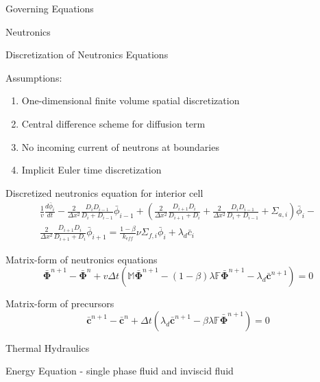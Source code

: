 \documentclass{beamer}
\begin{document}
\begin{section}{Governing Equations}
\begin{frame}{Neutronics}
\begin{customlist}{2ex}{0pt}
\end{customlist}
\end{frame}
\begin{frame}{Discretization of Neutronics Equations}
\begin{block}{Assumptions:}
\begin{enumerate}
  \item One-dimensional finite volume spatial discretization
  \item Central difference scheme for diffusion term
  \item No incoming current of neutrons at boundaries
  \item Implicit Euler time discretization
\end{enumerate}
\end{block}
\begin{customlist}{2ex}{0pt}
  \item Discretized neutronics equation for interior cell
  \begin{multline}
    \nonumber
    \frac{1}{v}\frac{d\bar{\phi}_{i}}{dt}-\frac{2}{\Delta x^{2}}\frac{D_{i}D_{i-1}}{D_{i}+D_{i-1}}\bar{\phi}_{i-1}+\left(\frac{2}{\Delta x^{2}}\frac{D_{i+1}D_{i}}{D_{i+1}+D_{i}}+\frac{2}{\Delta x^{2}}\frac{D_{i}D_{i-1}}{D_{i}+D_{i-1}}+\Sigma_{a,i}\right)\bar{\phi}_{i}-\\
    \frac{2}{\Delta x^{2}}\frac{D_{i+1}D_{i}}{D_{i+1}+D_{i}}\bar{\phi}_{i+1}=\frac{1-\beta}{k_{eff}}\nu\Sigma_{f,i}\bar{\phi}_{i}+\lambda_{d}\bar{c}_{i}
  \end{multline}
  \item Matrix-form of neutronics equations
  \[
    \bar{\mathbf{\Phi}}^{n+1}-\bar{\mathbf{\Phi}}^{n}+v\Delta t\left(\mathbb{M}\bar{\mathbf{\Phi}}^{n+1}-\left(1-\beta\right)\lambda\mathbb{F}\bar{\mathbf{\Phi}}^{n+1}-\lambda_{d}\mathbf{\bar{c}}^{n+1}\right)=0
  \]
  \item Matrix-form of precursors
  \[
    \mathbf{\bar{c}}^{n+1}-\mathbf{\bar{c}}^{n}+\Delta t\left(\lambda_{d}\mathbf{\bar{c}}^{n+1}-\beta\lambda\mathbb{F}\bar{\mathbf{\Phi}}^{n+1}\right)=0
  \]
\end{customlist}
\end{frame}
\begin{frame}{Thermal Hydraulics}
\begin{customlist}{2ex}{0pt}
  \item Energy Equation - single phase fluid and inviscid fluid

\end{customlist}
\end{frame}
\end{section}
\end{document}
